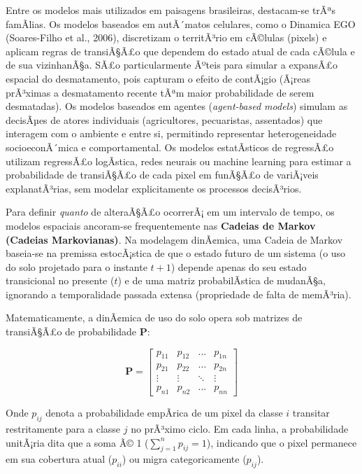 \documentclass[
  portuguese,
  11pt,
  a4paper,
  open=any]{scrbook}
\begin{document}
Entre os modelos mais utilizados em paisagens brasileiras, destacam-se
trÃªs famÃ­lias. Os modelos baseados em autÃ´matos celulares, como o
Dinamica EGO (Soares-Filho et al., 2006), discretizam o territÃ³rio em
cÃ©lulas (pixels) e aplicam regras de transiÃ§Ã£o que dependem do estado
atual de cada cÃ©lula e de sua vizinhanÃ§a. SÃ£o particularmente Ãºteis
para simular a expansÃ£o espacial do desmatamento, pois capturam o
efeito de contÃ¡gio (Ã¡reas prÃ³ximas a desmatamento recente tÃªm maior
probabilidade de serem desmatadas). Os modelos baseados em agentes
(\emph{agent-based models}) simulam as decisÃµes de atores individuais
(agricultores, pecuaristas, assentados) que interagem com o ambiente e
entre si, permitindo representar heterogeneidade socioeconÃ´mica e
comportamental. Os modelos estatÃ­sticos de regressÃ£o utilizam
regressÃ£o logÃ­stica, redes neurais ou machine learning para estimar a
probabilidade de transiÃ§Ã£o de cada pixel em funÃ§Ã£o de variÃ¡veis
explanatÃ³rias, sem modelar explicitamente os processos decisÃ³rios.

Para definir \emph{quanto} de alteraÃ§Ã£o ocorrerÃ¡ em um intervalo de
tempo, os modelos espaciais ancoram-se frequentemente nas
\textbf{Cadeias de Markov (Cadeias Markovianas)}. Na modelagem
dinÃ¢mica, uma Cadeia de Markov baseia-se na premissa estocÃ¡stica de
que o estado futuro de um sistema (o uso do solo projetado para o
instante \(t+1\)) depende apenas do seu estado transicional no presente
(\(t\)) e de uma matriz probabilÃstica de mudanÃ§a, ignorando a
temporalidade passada extensa (propriedade de falta de memÃ³ria).

Matematicamente, a dinÃ¢mica de uso do solo opera sob matrizes de
transiÃ§Ã£o de probabilidade \(\mathbf{P}\):

\[
\mathbf{P} = 
\begin{bmatrix} 
p_{11} & p_{12} & \dots & p_{1n} \\ 
p_{21} & p_{22} & \dots & p_{2n} \\ 
\vdots & \vdots & \ddots & \vdots \\ 
p_{n1} & p_{n2} & \dots & p_{nn} 
\end{bmatrix}
\]

Onde \(p_{ij}\) denota a probabilidade empÃrica de um pixel da classe
\(i\) transitar restritamente para a classe \(j\) no prÃ³ximo ciclo. Em
cada linha, a probabilidade unitÃ¡ria dita que a soma Ã© 1
(\(\sum_{j=1}^{n} p_{ij} = 1\)), indicando que o pixel permanece em sua
cobertura atual (\(p_{ii}\)) ou migra categoricamente (\(p_{ij}\)).
\end{document}
